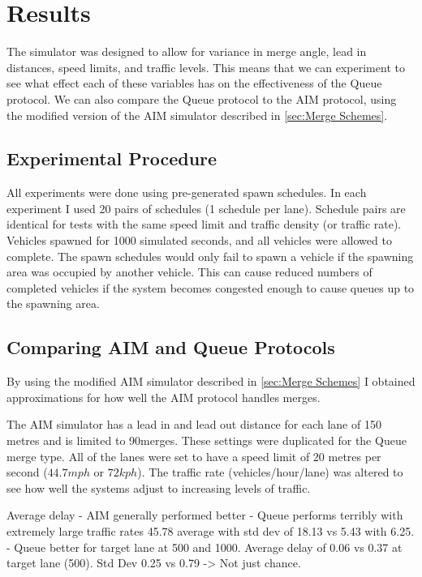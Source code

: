 \chapter{Results}
\label{cha:Results}
The simulator was designed to allow for variance in merge angle, lead in distances, speed limits, and traffic levels. This means that we can experiment to see what effect each of these variables has on the effectiveness of the Queue protocol. We can also compare the Queue protocol to the AIM protocol, using the modified version of the AIM simulator described in \ref{sec:Merge Schemes}.

\section{Experimental Procedure}
\label{sec:Experimental Procedure}
All experiments were done using pre-generated spawn schedules. In each experiment I used 20 pairs of schedules (1 schedule per lane). Schedule pairs are identical for tests with the same speed limit and traffic density (or traffic rate). Vehicles spawned for 1000 simulated seconds, and all vehicles were allowed to complete. The spawn schedules would only fail to spawn a vehicle if the spawning area was occupied by another vehicle. This can cause reduced numbers of completed vehicles if the system becomes congested enough to cause queues up to the spawning area.


\section{Comparing AIM and Queue Protocols}
\label{sec:Comparing AIM and Queue Protocols}
By using the modified AIM simulator described in \ref{sec:Merge Schemes} I obtained approximations for how well the AIM protocol handles merges.

The AIM simulator has a lead in and lead out distance for each lane of 150 metres and is limited to 90\degree merges. These settings were duplicated for the Queue merge type. All of the lanes were set to have a speed limit of 20 metres per second ($44.7\si{mph}$ or $72\si{kph}$). The traffic rate (vehicles/hour/lane) was altered to see how well the systems adjust to increasing levels of traffic.

Average delay
- AIM generally performed better
- Queue performs terribly with extremely large traffic rates 45.78 average with std dev of 18.13 vs 5.43 with 6.25. 
- Queue better for target lane at 500 and 1000. Average delay of 0.06 vs 0.37 at target lane (500). Std Dev 0.25 vs 0.79 -> Not just chance.

